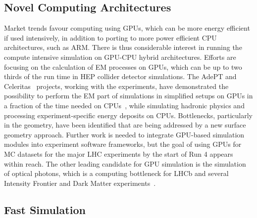 \documentclass[10pt,a4paper]{article}
\begin{document}
\subsection{Novel Computing
Architectures}\label{novel-computing-architectures}

Market trends favour computing using GPUs, which can be more energy efficient if
used intensively, in addition to porting to more power efficient CPU
architectures, such as ARM. There is thus considerable interest in running the
compute intensive simulation on GPU-CPU hybrid architectures. Efforts are
focusing on the calculation of EM processes on GPUs, which can be up to two
thirds of the run time in HEP collider detector simulations. The AdePT
\cite{Amadio_2023, AdePT} and Celeritas~\cite{osti_2361202} projects, working with the
experiments, have demonstrated the possibility to perform the EM part of
simulations in simplified setups on GPUs in a fraction of the time needed on
CPUs~\cite{add CHEP refs for A and C}, while simulating hadronic physics and
processing experiment-specific energy deposits on CPUs. Bottlenecks,
particularly in the geometry, have been identified that are being addressed by a
new surface geometry approach. Further work is needed to integrate GPU-based
simulation modules into experiment software frameworks, but the goal of using
GPUs for MC datasets for the major LHC experiments by the start of Run 4 appears
within reach. The other leading candidate for GPU simulation is the simulation
of optical photons, which is a computing bottleneck for LHCb and several
Intensity Frontier and Dark Matter experiments~\cite{opticksCHEP}.

\subsection{Fast Simulation}\label{fast-simulation}
\end{document}
